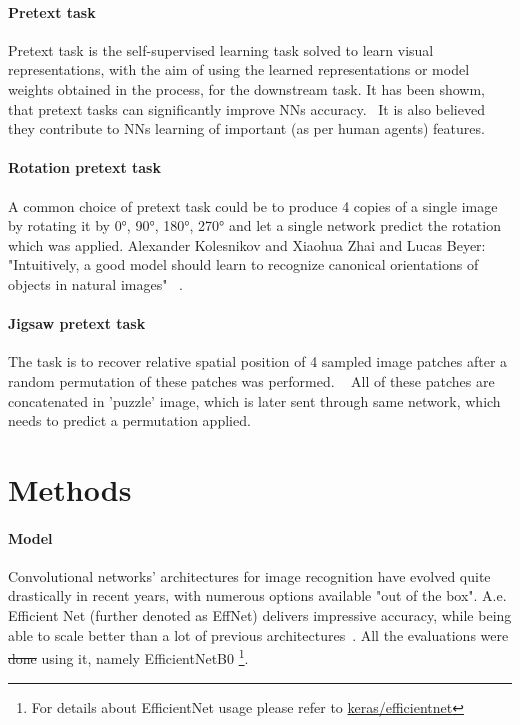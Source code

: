\paragraph{Pretext task}
Pretext task is the self-supervised learning task solved to learn visual representations,
with the aim of using the learned representations or model weights obtained in the process, for the downstream task.
It has been showm, that pretext tasks can significantly improve NNs accuracy.~\cite{kolesnikov2019revisiting}
It is also believed they contribute to NNs learning of important (as per human agents) features.

\paragraph{Rotation pretext task}
A common choice of pretext task could be to produce 4 copies of
a single image by rotating it by {0°, 90°, 180°, 270°} and let a single network predict the rotation which was applied.
Alexander Kolesnikov and Xiaohua Zhai and Lucas Beyer: "Intuitively, a good model should learn to
recognize canonical orientations of objects in natural images" ~\cite{kolesnikov2019revisiting}.

\paragraph{Jigsaw pretext task}
The task is to recover relative spatial position of 4 sampled image patches after a random permutation of these patches was performed.
~\cite{kolesnikov2019revisiting}
All of these patches are concatenated in 'puzzle' image, which is later sent through same network, which needs to predict a permutation applied.



\section{Methods}

\paragraph{Model}
Convolutional networks' architectures for image recognition have evolved quite drastically in recent years, with numerous options available "out of the box".
A.e. Efficient Net (further denoted as EffNet) delivers impressive accuracy, while being able to scale better than a lot of previous architectures~\cite{DBLP:journals/corr/abs-1905-11946}.
All the evaluations were \st{done} using it, namely EfficientNetB0 \footnote{For details about EfficientNet usage please refer to \href{https://keras.io/api/applications/efficientnet/}{keras/efficientnet}}.

